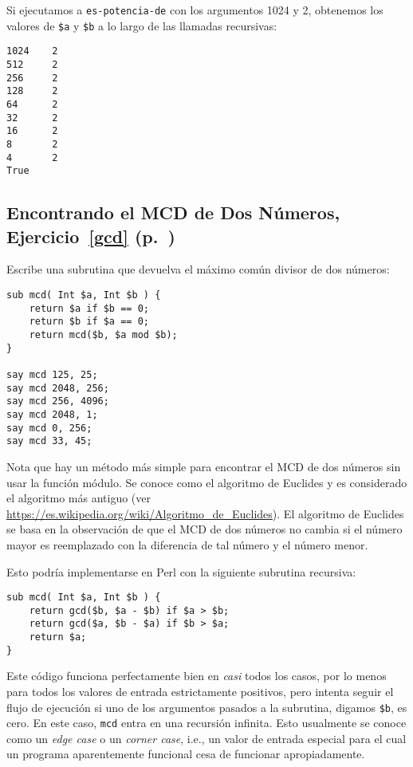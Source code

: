 Si ejecutamos a {\tt es-potencia-de} con los argumentos 1024 y 2,
obtenemos los valores de \verb|$a| y \verb|$b| a lo largo de las
llamadas recursivas:

\begin{verbatim}
1024    2
512     2
256     2
128     2
64      2
32      2
16      2
8       2
4       2
True
\end{verbatim}
%

\subsection{Encontrando el MCD de Dos Números, Ejercicio~\ref{gcd} (p.~\pageref{gcd})}

\label{sol_gcd}

Escribe una subrutina que devuelva el máximo común divisor de dos números:

\begin{verbatim}
sub mcd( Int $a, Int $b ) {
    return $a if $b == 0;
    return $b if $a == 0;
    return mcd($b, $a mod $b);
}

say mcd 125, 25;
say mcd 2048, 256;
say mcd 256, 4096;
say mcd 2048, 1;
say mcd 0, 256;
say mcd 33, 45;
\end{verbatim}

Nota que hay un método más simple para encontrar el MCD de
dos números sin usar la función módulo. Se conoce como 
el algoritmo de Euclides y es considerado el algoritmo más
antiguo (ver \url{https://es.wikipedia.org/wiki/Algoritmo_de_Euclides}).
El algoritmo de Euclides se basa en la observación de que 
el MCD de dos números no cambia si el número mayor es reemplazado
con la diferencia de tal número y el número menor.

Esto podría implementarse en Perl con la siguiente
subrutina recursiva:

\begin{verbatim}
sub mcd( Int $a, Int $b ) { 
    return gcd($b, $a - $b) if $a > $b;
    return gcd($a, $b - $a) if $b > $a;
    return $a;
}
\end{verbatim}
%

Este código funciona perfectamente bien en \emph{casi}
todos los casos, por lo menos para todos los valores
de entrada estrictamente positivos, pero intenta seguir
el flujo de ejecución si uno de los argumentos pasados
a la subrutina, digamos {\tt \$b}, es cero. En este caso,
{\tt mcd} entra en una recursión infinita. Esto usualmente se
conoce como un \emph{edge case} o un \emph{corner case}, i.e.,
un valor de entrada especial para el cual un programa aparentemente
funcional cesa de funcionar apropiadamente.

